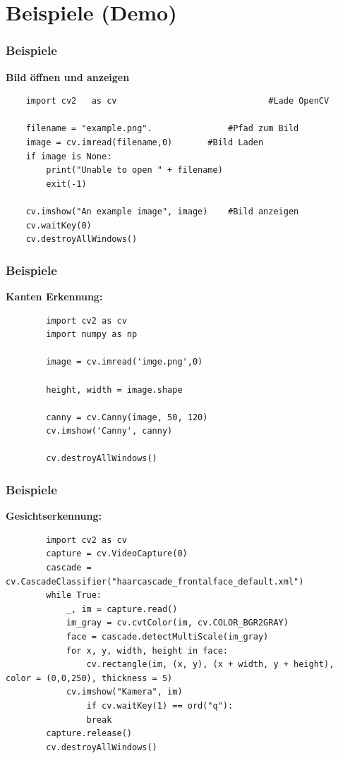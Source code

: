 \documentclass{beamer}
\begin{document}
\section{Beispiele (Demo)}
\begin{frame} [fragile]
\frametitle{Beispiele}
	\textbf{Bild öffnen und anzeigen}\\
\lstset{style=myStyle}
	\begin{lstlisting}
	import cv2   as cv								#Lade OpenCV
	
	filename = "example.png". 				#Pfad zum Bild 
	image = cv.imread(filename,0)  		#Bild Laden
	if image is None:               
		print("Unable to open " + filename)
		exit(-1)

	cv.imshow("An example image", image)    #Bild anzeigen
	cv.waitKey(0)
	cv.destroyAllWindows()
	\end{lstlisting}
	\cite{Howse2015}
\end{frame}

\begin{frame} [fragile]
\frametitle{Beispiele}
	\textbf{Kanten Erkennung:}\\
	\lstset{style=myStyle}
	\begin{lstlisting}
		import cv2 as cv
		import numpy as np
		
		image = cv.imread('imge.png',0)
		
		height, width = image.shape
		
		canny = cv.Canny(image, 50, 120)
		cv.imshow('Canny', canny)
		
		cv.destroyAllWindows()
	\end{lstlisting}
	\cite{Howse2015}
\end{frame}

\begin{frame} [fragile]
	\frametitle{Beispiele}
	\textbf{Gesichtserkennung:}\\
	\lstset{style=myStyle}
	\begin{lstlisting}
		import cv2 as cv
		capture = cv.VideoCapture(0)
		cascade = cv.CascadeClassifier("haarcascade_frontalface_default.xml")
		while True:
			_, im = capture.read()
			im_gray = cv.cvtColor(im, cv.COLOR_BGR2GRAY)
			face = cascade.detectMultiScale(im_gray)
			for x, y, width, height in face:
				cv.rectangle(im, (x, y), (x + width, y + height), color = (0,0,250), thickness = 5)
			cv.imshow("Kamera", im)
				if cv.waitKey(1) == ord("q"):
				break
		capture.release()
		cv.destroyAllWindows()
	\end{lstlisting}
	\cite{Howse2015}
\end{frame}
\end{document}
